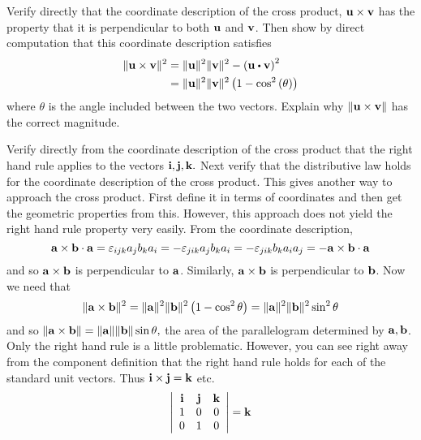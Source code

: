 \begin{enumialphparenastyle}
\begin{ex} Verify directly that the coordinate description of the cross product, 
${\bf u}\times {\bf v}$ has the property that it is perpendicular to both 
${\bf u}$ and ${\bf v}$. Then show by direct computation that this
coordinate description satisfies
\begin{align*}
\vectlength \vect{u}\times \vect{v}\vectlength ^{2}& =\vectlength \vect{u}
\vectlength ^{2}\vectlength \vect{v}\vectlength ^{2}-\tup{\vect{u}\dotprod \vect{v}} ^{2} \\
& =\vectlength \vect{u}\vectlength ^{2}\vectlength \vect{v}\vectlength
^{2}\tup{1-\cos ^{2}\tup{\theta } }
\end{align*}
where $\theta $ is the angle included between the two vectors. Explain why 
$\| {\bf u}\times {\bf v}\| $ has the correct magnitude.
\begin{sol}
Verify directly from the coordinate description of the cross product that the right hand rule applies to the vectors ${\bf i},{\bf j},{\bf k}.$ Next verify that the
distributive law holds for the coordinate description of the cross product.
This gives another way to approach the cross product. First define it in
terms of coordinates and then get the geometric properties from this.
However, this approach does not yield the right hand rule property very
easily. From the coordinate description,
\[
{\bf a}\times {\bf b}\cdot {\bf a}=\varepsilon _{ijk}a_{j}b_{k}a_{i}=-\varepsilon
_{jik}a_{j}b_{k}a_{i}=-\varepsilon _{jik}b_{k}a_{i}a_{j}=-{\bf a}\times
{\bf b}\cdot {\bf a}
\]
and so ${\bf a}\times {\bf b}$ is perpendicular to ${\bf a}$. Similarly, $
{\bf a}\times {\bf b}$ is perpendicular to ${\bf b}$. Now we need that 
\[
\| {\bf a}\times {\bf b}\| ^{2}=\| {\bf a}
\| ^{2}\| {\bf b}\| ^{2}\left(1-\cos
^{2}\theta \right) =\| {\bf a}\| ^{2}\| {\bf b
}\| ^{2}\sin ^{2}\theta
\]
and so $\| {\bf a}\times {\bf b}\| =\| {\bf a}
\| \| {\bf b}\| \sin \theta ,$ the area of the
parallelogram determined by ${\bf a},{\bf b}$. Only the right hand rule is a
little problematic. However, you can see right away from the component
definition that the right hand rule holds for each of the standard unit
vectors. Thus ${\bf i}\times {\bf j}={\bf k}$ etc.
\[
\left\vert
\begin{array}{ccc}
{\bf i} & {\bf j} & {\bf k} \\
1 & 0 & 0 \\
0 & 1 & 0
\end{array}
\right\vert ={\bf k}
\]
\end{sol}
\end{ex}


\end{enumialphparenastyle}